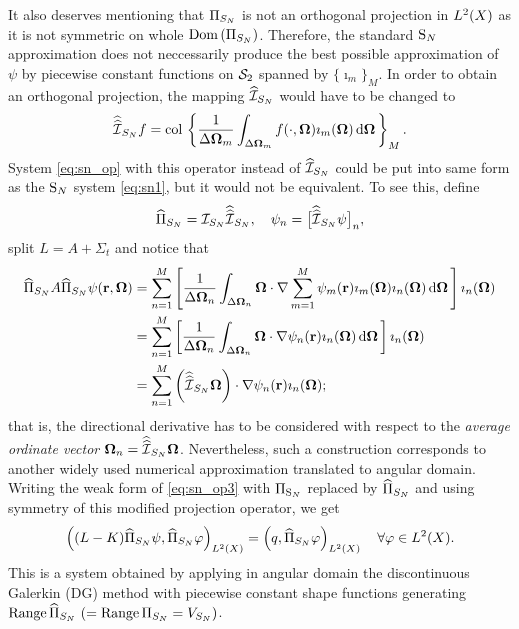 It also deserves mentioning that $\Projop[S_N]$ is not an orthogonal projection in \linebreak[4]\mbox{$\Lp[2](X)$}
as it is not symmetric on whole $\Dom{\Projop[S_N]}$. Therefore, the standard $\SN$ approximation does not
neccessarily produce the best possible approximation of $\psi$ by piecewise constant functions on $\Sphere$ spanned by $\{\imath_m\}_M$. In order to
obtain an orthogonal projection, the mapping $\PihSN$ would have to be changed to 
$$
	\widehat{\widehat{\mathcal{I}}}_{S_N} f = \col\left\{\frac{1}{\Delta\bomega_m}\int_{\Delta\bomega_m}f(\cdot,\bomega)
	\imath_m(\bomega)\,\d{\bomega}\right\}_{\idxset{M}}.
$$
System \eqref{eq:sn_op} with this operator instead of $\PihSN$ could be put into same form as the $\SN$ system
\eqref{eq:sn1}, but it would not be equivalent. To see this, define 
$$
	\widehat\Proj_{S_N} = \PiSN\widehat{\widehat{\mathcal{I}}}_{S_N},\quad \psi_n =
	\bigl[\widehat{\widehat{\mathcal{I}}}_{S_N}\psi\bigr]_n, 
$$ 
split $L = A + \Sigma_t$ and notice that
$$
\begin{aligned}
	\widehat\Proj_{S_N} A \widehat\Proj_{S_N} \psi(\br,\bomega) &= \sum_{n=1}^M  
	\left[\frac{1}{\Delta\bomega_n}\int_{\Delta\bomega_n}\bomega\cdot\nabla \sum_{m=1}^M
	\psi_m(\br) \imath_m(\bomega)\imath_n(\bomega)\,\d{\bomega}\right] \imath_n(\bomega)\\
	& = \sum_{n=1}^M  
	\left[\frac{1}{\Delta\bomega_n}\int_{\Delta\bomega_n}\bomega\cdot\nabla 
	\psi_n(\br) \imath_n(\bomega)\,\d{\bomega}\right] \imath_n(\bomega)\\
	& = \sum_{n=1}^M \left(\widehat{\widehat{\mathcal{I}}}_{S_N}\bomega\right)  \cdot\nabla 
	\psi_n(\br) \imath_n(\bomega);
\end{aligned}
$$
that is, the directional derivative has to be considered with respect to the \textit{average ordinate vector}
$\bomega_n = \widehat{\widehat{\mathcal{I}}}_{S_N}\bomega$. Nevertheless, such a construction corresponds to
another widely used numerical approximation translated to angular domain.  Writing the weak form of \eqref{eq:sn_op3} with $\Projop[\SN]$ replaced by $\widehat\Proj_{S_N}$ and using symmetry of this modified projection operator, we get
\begin{equation}\label{eq:SN_weak}
	\left((\op{L}  - \op{K})\widehat\Proj_{S_N} \psi, \widehat\Proj_{S_N} \varphi \right)_{\Lp[2](X)} = \left( q,
	\widehat\Proj_{S_N} \varphi \right)_{\Lp[2](X)}\quad \forall \varphi\in \Lp[2](X). 
\end{equation}
This is a system obtained by applying in angular domain the discontinuous Galerkin (DG) method
 with piecewise constant shape functions generating \linebreak
\mbox{$\Rng \widehat\Proj_{S_N}\ (= \Rng \Projop[S_N] = V_{S_N})$}.   %

